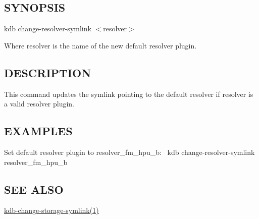 \subsection*{S\+Y\+N\+O\+P\+S\+IS}

{\ttfamily kdb change-\/resolver-\/symlink $<$resolver$>$}

Where {\ttfamily resolver} is the name of the new default resolver plugin.

\subsection*{D\+E\+S\+C\+R\+I\+P\+T\+I\+ON}

This command updates the symlink pointing to the default resolver if {\ttfamily resolver} is a valid resolver plugin.

\subsection*{E\+X\+A\+M\+P\+L\+ES}

Set default resolver plugin to resolver\+\_\+fm\+\_\+hpu\+\_\+b\+:~\newline
 {\ttfamily kdb change-\/resolver-\/symlink resolver\+\_\+fm\+\_\+hpu\+\_\+b}

\subsection*{S\+EE A\+L\+SO}


\begin{DoxyItemize}
\item \hyperlink{doc_help_kdb-change-storage-symlink_md}{kdb-\/change-\/storage-\/symlink(1)} 
\end{DoxyItemize}